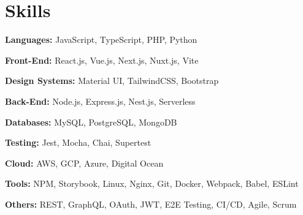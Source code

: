 \documentclass[letterpaper,12pt]{article}
\newcommand{\resumeSubHeadingListStart}{\begin{itemize}[leftmargin=0.15in, label={}]}
\newcommand{\resumeSubHeadingListEnd}{\end{itemize}}
\begin{document}
\section{Skills}
\vspace{2pt}
\resumeSubHeadingListStart
\small{\item{

                \textbf{Languages:}{ JavaScript, TypeScript, PHP, Python} \\ \vspace{3pt}

                \textbf{Front-End:}{ React.js, Vue.js, Next.js, Nuxt.js, Vite} \\ \vspace{3pt}

                \textbf{Design Systems:}{ Material UI, TailwindCSS, Bootstrap} \\ \vspace{3pt}

                \textbf{Back-End:}{ Node.js, Express.js, Nest.js, Serverless} \\ \vspace{3pt}

                \textbf{Databases:}{ MySQL, PostgreSQL, MongoDB} \\ \vspace{3pt}

                \textbf{Testing:}{ Jest, Mocha, Chai, Supertest} \\ \vspace{3pt}

                \textbf{Cloud:}{ AWS, GCP, Azure, Digital Ocean} \\ \vspace{3pt}

                \textbf{Tools:}{ NPM, Storybook, Linux, Nginx, Git, Docker, Webpack, Babel, ESLint} \\ \vspace{3pt}

                \textbf{Others:}{ REST, GraphQL, OAuth, JWT, E2E Testing, CI/CD, Agile, Scrum} \\ \vspace{3pt}
          }}
\resumeSubHeadingListEnd



\end{document}
